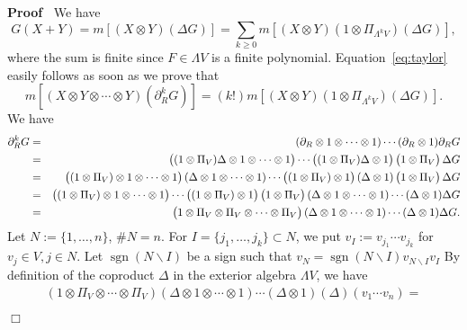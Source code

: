 \documentclass[11pt]{article}
\newcommand{\assign}{:=}
\newcommand{\tmop}[1]{\ensuremath{\operatorname{#1}}}
\newenvironment{proof}{\noindent\textbf{Proof\ }}{\hspace*{\fill}$\Box$\medskip}
\begin{document}
\begin{proof}
  We have
  \[ G (X + Y) = m [(X \otimes Y) (\Delta G)] = \sum_{k \geqslant 0} m [(X
     \otimes Y) (1 \otimes \Pi_{\Lambda^k V}) (\Delta G)], \]
  where the sum is finite since $F \in \Lambda V$ is a finite polynomial.
  Equation~{\eqref{eq:taylor}} easily follows as soon as we prove that
  \[ m [(X \otimes Y \otimes \cdots \otimes Y) (\partial_R^k G)] = (k!) m [(X
     \otimes Y) (1 \otimes \Pi_{\Lambda^k V}) (\Delta G)] . \]
  We have
  \begin{eqnarray*}
    \partial^k_R G & = & (\partial_R \otimes 1 \otimes \cdots \otimes 1)
    \cdots (\partial_R \otimes 1) \partial_R G\\
    & = & \left( \vphantom{\tfrac{a}{b}} (1 \otimes \Pi_V) \Delta \otimes 1
    \otimes \cdots \otimes 1 \right) \cdots \left( \vphantom{\tfrac{a}{b}} (1
    \otimes \Pi_V) \Delta \otimes 1 \right) \left( \vphantom{\tfrac{a}{b}} 1
    \otimes \Pi_V \right) \Delta G\\
    & = & \left( \vphantom{\tfrac{a}{b}} (1 \otimes \Pi_V) \otimes 1 \otimes
    \cdots \otimes 1 \right) (\Delta \otimes 1 \otimes \cdots \otimes 1)
    \cdots \left( \vphantom{\tfrac{a}{b}} (1 \otimes \Pi_V) \otimes 1 \right)
    (\Delta \otimes 1) \left( \vphantom{\tfrac{a}{b}} 1 \otimes \Pi_V \right)
    \Delta G\\
    & = & \left( \vphantom{\tfrac{a}{b}} (1 \otimes \Pi_V) \otimes 1 \otimes
    \cdots \otimes 1 \right) \cdots \left( \vphantom{\tfrac{a}{b}} (1 \otimes
    \Pi_V) \otimes 1 \right) \left( \vphantom{\tfrac{a}{b}} 1 \otimes \Pi_V
    \right)  (\Delta \otimes 1 \otimes \cdots \otimes 1) \cdots (\Delta
    \otimes 1) \Delta G\\
    & = & \left( \vphantom{\tfrac{a}{b}} 1 \otimes \Pi_V \otimes \Pi_V
    \otimes \cdots \otimes \Pi_V \right)  (\Delta \otimes 1 \otimes \cdots
    \otimes 1) \cdots (\Delta \otimes 1) \Delta G.
  \end{eqnarray*}
  Let $N \assign \{ 1, \ldots, n \}$, $\#N = n$. For $I = \{ j_1, \ldots, j_k
  \} \subset N$, we put $v_I \assign v_{j_1} \cdots v_{j_k}$ for $v_j \in V, j
  \in N$. Let $\tmop{sgn} (N\backslash I)$ be a sign such that $v_N =
  \tmop{sgn} (N\backslash I) v_{N\backslash I} v_I$ By definition of the
  coproduct $\Delta$ in the exterior algebra $\Lambda V$, we have
  \[ \begin{array}{c}
       (1 \otimes \Pi_V \otimes \cdots \otimes \Pi_V) (\Delta \otimes 1
       \otimes \cdots \otimes 1) \cdots (\Delta \otimes 1) (\Delta) (v_1
       \cdots v_n) =\\

\end{array}\]
\end{proof}
\end{document}

